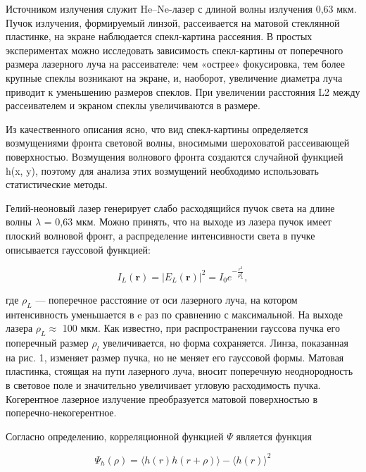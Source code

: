 \documentclass[a4paper, 12pt]{article}%
\begin{document}
	
	Источником излучения служит He–Ne-лазер с длиной волны излучения 0,63 мкм. Пучок излучения, формируемый линзой, рассеивается на
	матовой стеклянной пластинке, на экране наблюдается спекл-картина
	рассеяния. В простых экспериментах можно исследовать зависимость спекл-картины от
	поперечного размера лазерного луча на рассеивателе: чем «острее» фокусировка, тем более крупные спеклы возникают на экране, и, наоборот,
	увеличение диаметра луча приводит к уменьшению размеров спеклов.
	При увеличении расстояния L2 между рассеивателем и экраном спеклы
	увеличиваются в размере.
	
	Из качественного описания ясно, что вид спекл-картины определяется возмущениями фронта световой волны, вносимыми шероховатой
	рассеивающей поверхностью. Возмущения волнового фронта создаются случайной функцией h(x, y), поэтому для анализа этих возмущений
	необходимо использовать статистические методы.
	
	Гелий-неоновый лазер генерирует слабо расходящийся пучок
	света на длине волны $\lambda$ = 0,63 мкм. Можно принять, что на выходе
	из лазера пучок имеет плоский волновой фронт, а распределение
	интенсивности света в пучке описывается гауссовой функцией:
	
	\begin{equation}
		I_L(\boldsymbol{r})=\left|E_L(\boldsymbol{r})\right|^2=I_0 e^{-\frac{r^2}{\rho_L^2}},
	\end{equation}

где   $\rho_L$ — поперечное расстояние от оси лазерного луча, на котором интенсивность уменьшается в e раз по сравнению с максимальной. На выходе лазера $\rho_L \approx$  100 мкм. Как известно, при распространении гауссова
пучка его поперечный размер $\rho_l$ увеличивается, но форма сохраняется. Линза, показанная на рис. 1, изменяет размер пучка, но не меняет
его гауссовой формы. Матовая пластинка, стоящая на пути лазерного
луча, вносит поперечную неоднородность в световое поле и значительно
увеличивает угловую расходимость пучка. Когерентное лазерное излучение преобразуется матовой поверхностью в поперечно-некогерентное.
	
Согласно определению, корреляционной функцией $\Psi$ является функция

\begin{equation}
	\Psi_h(\rho)=\langle h(r) h(r+\rho)\rangle-\langle h(r)\rangle^2
\end{equation}
\end{document}
